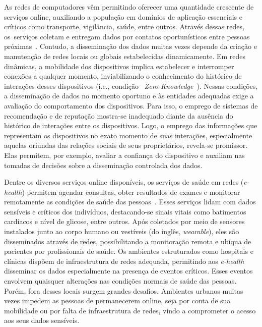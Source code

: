 \documentclass[12pt]{article}
\begin{document}

As redes de computadores vêm permitindo oferecer uma quantidade crescente de serviços online, auxiliando a população em domínios de aplicação essenciais e críticos como transporte, vigilância, saúde, entre outros. Através dessas redes, os~serviços coletam e entregam dados por contatos oportunísticos entre pessoas próximas~\cite{garyfalos2008coupons}. 
Contudo, a disseminação %
dos  
dados muitas vezes depende da criação e manutenção de redes locais ou globais estabelecidas dinamicamente. Em redes dinâmicas, a mobilidade dos dispositivos implica estabelecer e interromper conexões a qualquer momento, inviabilizando o conhecimento do histórico de interações desses dispositivos (i.e., condição ~\textit{Zero-Knowledge}~\cite{feige1988zero,kim2015hcs}). Nessas condições, 
a disseminação de dados no momento oportuno e às entidades adequadas exige a avaliação do comportamento dos dispositivos. 
Para isso, o emprego de sistemas de recomendação e de reputação mostra-se inadequado diante da ausência do histórico de interações entre os dispositivos. Logo, o emprego das informações que representam os dispositivos no exato momento de suas interações, especialmente aquelas oriundas das relações sociais de seus proprietários, revela-se promissor. Elas permitem, por exemplo, avaliar a confiança do dispositivo e auxiliam nas tomadas de decisões sobre a disseminação controlada dos dados.


Dentre os diversos serviços online disponíveis, os serviços de saúde em redes (\textit{e-health}) permitem agendar consultas, obter resultados de exames e monitorar remotamente as condições de saúde das pessoas~\cite{gharaibeh2017smart}. Esses serviços lidam com dados sensíveis e críticos dos indivíduos, destacando-se sinais vitais como batimentos cardíacos e nível de glicose, entre outros. Após coletados por meio de sensores instalados junto ao corpo humano ou vestíveis (do inglês, \textit{wearable}), eles são disseminados através de redes, possibilitando a monitoração remota e ubíqua de pacientes por profissionais de saúde. Os ambientes estruturados como hospitais e clínicas dispõem de infraestrutura de redes adequada, permitindo aos \textit{e-health} disseminar os dados especialmente na presença de eventos críticos. Esses eventos envolvem quaisquer alterações nas condições normais de saúde das pessoas. Porém, fora desses locais surgem grandes desafios. Ambientes urbanos muitas vezes impedem as pessoas de permanecerem online, seja por conta de sua mobilidade ou por falta de infraestrutura de redes, vindo a comprometer o acesso aos seus dados sensíveis.
\end{document}
